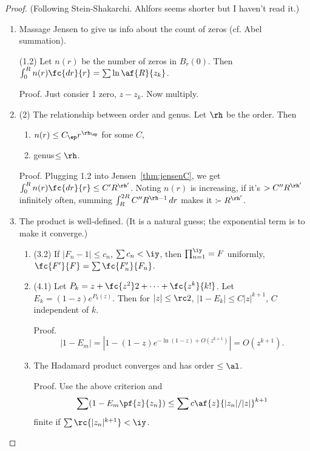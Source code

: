 \begin{proof}
(Following Stein-Shakarchi. Ahlfors seems shorter but I haven't read it.)
\begin{enumerate}
\item Massage Jensen to give us info about the count of zeros (cf. Abel summation). 

(1.2) Let $n(r)$ be the number of zeros in $B_r(0)$. Then $\int_0^R n(r)\fc{dr}{r}=\sum \ln \af{R}{z_k}$.

Proof. Just consier 1 zero, $z-z_k$. Now multiply.
\item (2) The relationship between order and genus. Let $\rh$ be the order. Then 
\begin{enumerate}
\item
$n(r)\le C_\ep r^{\rh_\ep}$ for some $C$, 
\item 
genus$\le \rh$.
\end{enumerate}

Proof. Plugging 1.2 into Jensen~\ref{thm:jensenC}, we get $\int_0^R n(r)\fc{dr}{r} \le C' R^{\rh'}$. Noting $n(r)$ is increasing, if it's $>C''R^{\rh'}$ infinitely often, summing $\int_R^{2R} C''R^{\rh-1}\,dr$ makes it $\succ R^{\rh'}$.
\item
The product is well-defined. (It is a natural guess; the exponential term is to make it converge.)
\begin{enumerate}
\item
(3.2) If $|F_n-1|\le c_n$, $\sum c_n<\iy$, then $\prod_{n=1}^{\iy}=F$ uniformly, $\fc{F'}{F}=\sum \fc{F_n'}{F_n}$.
\item (4.1) Let $P_k = z+\fc{z^2}2+\cdots +\fc{z^k}{k!}$.
Let $E_k = (1-z)e^{P_k(z)}$. Then for $|z|\le \rc2$, $|1-E_k|\le C|z|^{k+1}$, $C$ independent of $k$. 

Proof. 
\[
|1-E_m|=|1-(1-z)e^{-\ln (1-z)+O(z^{k+1})}|=O(z^{k+1}).
\]
\item The Hadamard product converges and has order $\le \al$.

Proof. Use the above criterion and 
\[
\sum (1-E_m\pf{z}{z_n}) \le \sum c\af{z}{|z_n|/|z|}^{k+1}
\]
finite if $\sum \rc{|z_n|^{k+1}}<\iy$. %


\end{enumerate}
\end{enumerate}
\end{proof}
